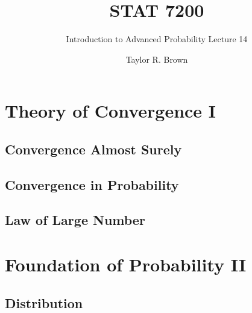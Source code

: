 \documentclass[handout]{beamer}
\title{STAT 7200}
\subtitle{Introduction to Advanced Probability \newline Lecture 14}
\author{Taylor R. Brown}
\institute{}
\date{}
\begin{document}
\frame{\titlepage}

\section[Outline]{}
\frame{\tableofcontents}



\section{Theory of Convergence I}


\subsection{Convergence Almost Surely}

\subsection{Convergence in Probability}

\subsection{Law of Large Number }


\section{Foundation of Probability II}

\subsection{Distribution}
\end{document}

